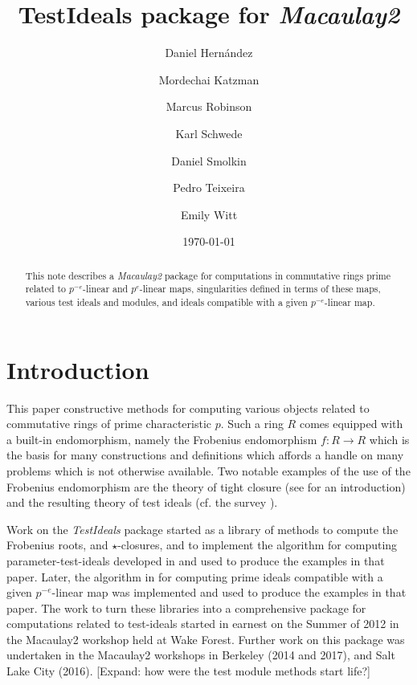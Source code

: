 \documentclass[11pt]{amsart}
\begin{document}
\title{{TestIdeals} package for \emph{Macaulay2}}
\author{Daniel Hern\'andez}
\author{Mordechai Katzman}
\author{Marcus Robinson}
\author{Karl Schwede}
\author{Daniel Smolkin}
\author{Pedro Teixeira}
\author{Emily Witt}
\date{\today}
\address{Department of Mathematics, University of Utah, 155 S 1400 E Room 233, Salt Lake City, UT, 84112}

\begin{abstract}
  This note describes a \emph{Macaulay2} package for computations in commutative rings prime related to $p^{-e}$-linear and $p^{e}$-linear  maps,
  singularities defined in terms of these maps,  various test ideals and modules, and ideals compatible with a given $p^{-e}$-linear map.
\end{abstract}




\maketitle

\section{Introduction}

This paper constructive methods for computing various objects related to commutative rings of prime characteristic $p$.
Such a ring $R$ comes equipped with a built-in endomorphism, namely the Frobenius endomorphism $f:R \rightarrow R$ which is the basis for many constructions and definitions
which affords a handle on many problems which is not otherwise available. Two notable examples of the use of the Frobenius endomorphism are the theory of tight closure
(see \cite{HochsterHunekeTC1} for an introduction)
and the resulting theory of test ideals
(cf. the survey \cite{SchwedeTuckerTestIdealSurvey}).

Work on the \emph{TestIdeals} package started as a library of methods to compute the Frobenius roots, and $\star$-closures, and to implement the algorithm for computing parameter-test-ideals
developed in \cite{KatzmanParameterTestIdealOfCMRings} and \cite{KatzmanFrobeniusMapsOnInjectiveHulls} used to produce the examples in that paper.
Later, the algorithm in  \cite{KatzmanSchwedeAlgorithm} for computing prime ideals compatible with a given $p^{-e}$-linear map was implemented and
used to produce the examples in that paper. The work to turn these libraries into a comprehensive package for computations related to test-ideals
started in earnest on the Summer of 2012 in the Macaulay2 workshop held at Wake Forest. Further work on this package was undertaken in the Macaulay2 workshops in
Berkeley (2014 and 2017), and Salt Lake City (2016).
{\hfill\large\color{red} [Expand: how were the test module methods start life?]}\\
\end{document}
